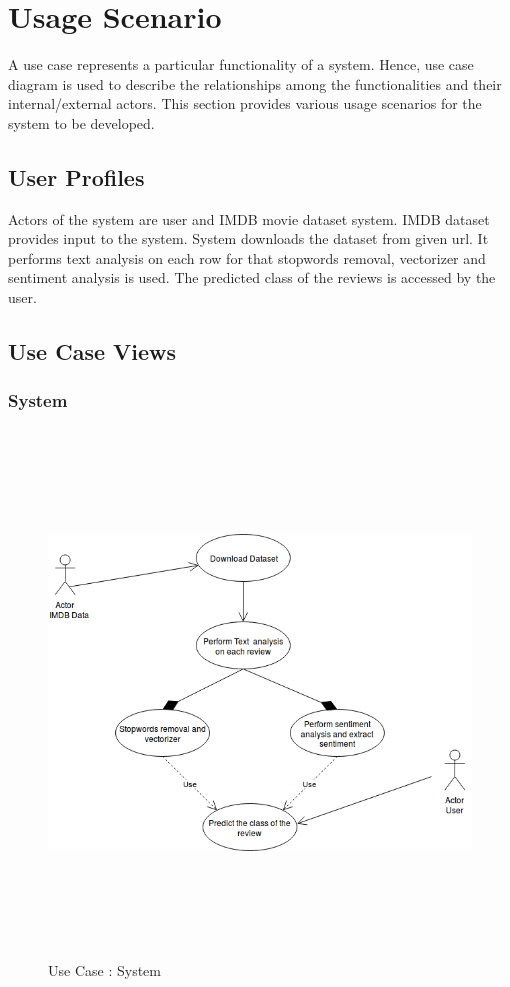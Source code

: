 \documentclass[oneside,a4paper,12pt]{pictreport}
\begin{document}
\section{Usage Scenario}
A use case represents a particular functionality of a system. Hence, use case diagram is used to describe the relationships among the functionalities and their internal/external actors. This section provides various usage scenarios for the system to be developed.

\subsection{User Profiles}
Actors of the system are user and IMDB movie dataset system.
IMDB dataset provides input to the system. System downloads the 
dataset from given url. It performs text analysis on each row for that
stopwords removal, vectorizer and sentiment analysis is used.
The predicted class of the reviews is accessed by the user.



\subsection{Use Case Views}
\subsubsection{System}
\begin{figure}[h!]
\includegraphics[width=5.2in,height=5.5in]{use_case.png}
\caption{Use Case : System}
\end{figure}
\newpage
\end{document}
